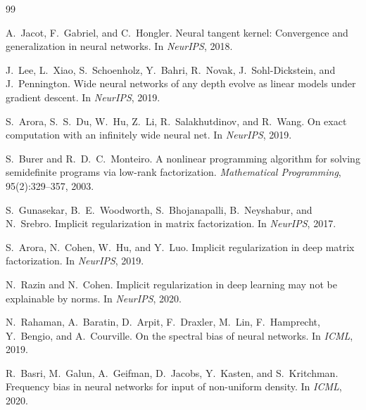 \documentclass[11pt]{article}
\theoremstyle{definition}
\theoremstyle{plain}
\begin{document}

\begin{thebibliography}{99}

A.~Jacot, F.~Gabriel, and C.~Hongler.
\newblock Neural tangent kernel: Convergence and generalization in neural networks.
\newblock In \emph{NeurIPS}, 2018.

J.~Lee, L.~Xiao, S.~Schoenholz, Y.~Bahri, R.~Novak, J.~Sohl-Dickstein, and J.~Pennington.
\newblock Wide neural networks of any depth evolve as linear models under gradient descent.
\newblock In \emph{NeurIPS}, 2019.

S.~Arora, S.~S.~Du, W.~Hu, Z.~Li, R.~Salakhutdinov, and R.~Wang.
\newblock On exact computation with an infinitely wide neural net.
\newblock In \emph{NeurIPS}, 2019.

S.~Burer and R.~D.~C.~Monteiro.
\newblock A nonlinear programming algorithm for solving semidefinite programs via low-rank factorization.
\newblock \emph{Mathematical Programming}, 95(2):329--357, 2003.

S.~Gunasekar, B.~E.~Woodworth, S.~Bhojanapalli, B.~Neyshabur, and N.~Srebro.
\newblock Implicit regularization in matrix factorization.
\newblock In \emph{NeurIPS}, 2017.

S.~Arora, N.~Cohen, W.~Hu, and Y.~Luo.
\newblock Implicit regularization in deep matrix factorization.
\newblock In \emph{NeurIPS}, 2019.

N.~Razin and N.~Cohen.
\newblock Implicit regularization in deep learning may not be explainable by norms.
\newblock In \emph{NeurIPS}, 2020.

N.~Rahaman, A.~Baratin, D.~Arpit, F.~Draxler, M.~Lin, F.~Hamprecht, Y.~Bengio, and A.~Courville.
\newblock On the spectral bias of neural networks.
\newblock In \emph{ICML}, 2019.

R.~Basri, M.~Galun, A.~Geifman, D.~Jacobs, Y.~Kasten, and S.~Kritchman.
\newblock Frequency bias in neural networks for input of non-uniform density.
\newblock In \emph{ICML}, 2020.

\end{thebibliography}
\end{document}
